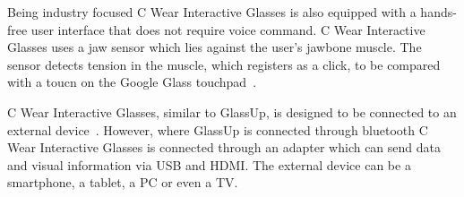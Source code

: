 \begin{itemize}
Being industry focused C Wear Interactive Glasses is also equipped with a hands-free user interface  that does not require voice command. C Wear Interactive Glasses uses a jaw sensor which lies against the user's jawbone muscle. The sensor detects tension in the muscle, which registers as a click, to be compared with a toucn on the Google Glass touchpad~\cite{pennyProducts}.

C Wear Interactive Glasses, similar to GlassUp, is designed to be connected to an external device~\cite{pennyProducts}. However, where GlassUp is connected through bluetooth C Wear Interactive Glasses is connected through an adapter which can send data and visual information via USB and HDMI. The external device can be a smartphone, a tablet, a PC or even a TV.
\end{itemize}
